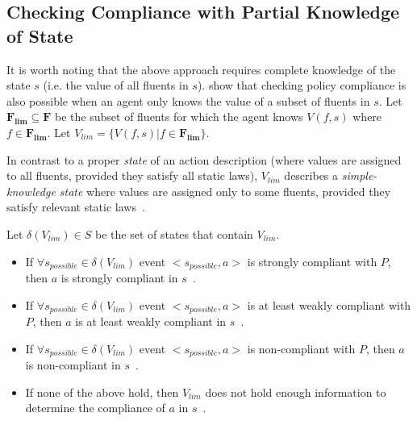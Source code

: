 \subsection{Checking Compliance with Partial Knowledge of State}

It is worth noting that the above approach requires complete knowledge of the state $s$ (i.e. the value of all fluents in $s$).
\citet{gelfond_authorization_2008} show that checking policy compliance is also possible when an agent only knows the value of a subset of fluents in $s$.
Let $\boldsymbol{F_{lim}} \subseteq \boldsymbol{F}$ be the subset of fluents for which the agent knows $V(f, s)$ where $f \in \boldsymbol{F_{lim}}$.
Let $V_{lim} = \{V(f, s) | f \in \boldsymbol{F_{lim}}\}$.

\begin{definition}
    \label{def:simple_knowledge_state}
    In contrast to a proper \textit{state} of an action description (where values are assigned to all fluents, provided they satisfy all static laws), $V_{lim}$ describes a \textit{simple-knowledge state} where values are assigned only to some fluents, provided they satisfy relevant static laws~\citep{gelfond_authorization_2008}.
\end{definition}

\begin{definition}
    Let $\delta(V_{lim}) \in S$ be the set of states that contain $V_{lim}$.

    \begin{itemize}
        \item If $\forall s_{possible} \in \delta(V_{lim})$ event $<s_{possible}, a>$ is strongly compliant with $P$, then $a$ is strongly compliant in $s$~\citep{gelfond_authorization_2008}.
        \item If $\forall s_{possible} \in \delta(V_{lim})$ event $<s_{possible}, a>$ is at least weakly compliant with $P$, then $a$ is at least weakly compliant in $s$~\citep{gelfond_authorization_2008}.
        \item If $\forall s_{possible} \in \delta(V_{lim})$ event $<s_{possible}, a>$ is non-compliant with $P$, then $a$ is non-compliant in $s$~\citep{gelfond_authorization_2008}.
        \item If none of the above hold, then $V_{lim}$ does not hold enough information to determine the compliance of $a$ in $s$~\citep{gelfond_authorization_2008}.
    \end{itemize}
\end{definition}

